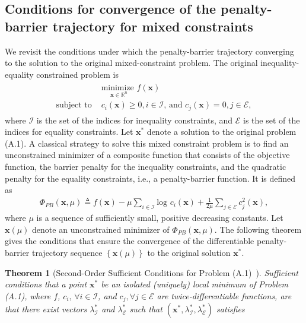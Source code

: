 \documentclass{article}
\newcommand{\bs}{ \boldsymbol}
\newcommand{\mb}{\mathbb}
\newcommand{\lt}{\left}
\newcommand{\rt}{\right}
\newtheorem{theorem}{Theorem}[section]
\begin{document}
{}


\begin{appendices}
\section{Conditions for convergence of the penalty-barrier trajectory for mixed constraints}
We revisit the conditions under which the  penalty-barrier trajectory converging to the solution to the original mixed-constraint problem. The original inequality-equality constrained problem is 
\begin{align}
\begin{split}
&\underset{\bs{x} \in \mb{R}^n}{\text{minimize }}f\lt(\bs{x}\rt)\\
\text{subject to }&  c_i\lt(\bs{x}\rt) \ge 0, i\in \mathcal{I} \text{, and } c_j\lt(\bs{x}\rt) = 0, j \in \mathcal{E} ,
\end{split}
\end{align}
where $\mathcal{I}$ is the set of the indices for inequality constraints, and $\mathcal{E}$ is the set of the indices for equality constraints. Let $\bs{x}^*$ denote a solution to the original problem (A.1). A classical strategy to solve this mixed constraint problem is to find an unconstrained minimizer of a composite function that consists of the objective function, the barrier penalty for the inequality constraints, and the quadratic penalty for the equality constraints, i.e., a penalty-barrier function. It is defined as
\begin{align}
\Phi_{PB}\lt(\bs{x}, \mu \rt) \triangleq f\lt(\bs{x}\rt) - \mu \underset{ i \in \mathcal{I}}{\sum} \text{log }c_i\lt(\bs{x}\rt) + \frac{1}{2\mu} \underset{j \in \mathcal{E}}{\sum}c^2_j\lt(\bs{x}\rt),
\end{align}
where $\mu$ is a sequence of sufficiently small, positive decreasing constants. Let $\bs{x}(\mu)$ denote an unconstrained minimizer of $\Phi_{PB}(\bs{x}, \mu)$. The following theorem gives the conditions that ensure the convergence of the differentiable penalty-barrier trajectory sequence $\lt\{ \bs{x}(\mu)\rt\}$ to the original solution $\bs{x}^*$.
\begin{theorem}[Second-Order Sufficient Conditions for Problem (A.1)~\cite{fiacco, Forsgren2002}]
	Sufficient conditions that a point $\bs{x}^*$ be an isolated (uniquely) local minimum of Problem (A.1), where $f$, $c_i, \, \forall i \in \mathcal{I}$, and $c_j, \forall j \in \mathcal{E}$ are twice-differentiable functions, are that there exist vectors $\lambda_{\mathcal{I}}^*$ and $\lambda_{\mathcal{E}}^*$ such that $\lt(\bs{x}^*, \lambda_{\mathcal{I}}^*, \lambda_{\mathcal{E}}^*\rt)$ satisfies

\end{theorem}
\end{appendices}
\end{document}

